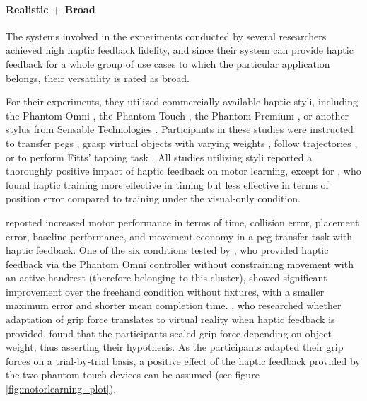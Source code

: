 \paragraph{Realistic + Broad} \label{sec:realisticbroad}
The systems involved in the experiments conducted by several researchers achieved high haptic feedback fidelity, and since their system can provide haptic feedback for a whole group of use cases to which the particular application belongs, their versatility is rated as broad.

For their experiments, they utilized commercially available haptic styli, including the Phantom Omni \cite{Brickler2019, Fehlberg2012}, the Phantom Touch \cite{Gunter2022}, the Phantom Premium \cite{Rodriguez2010, Wall2000}, or another stylus from Sensable Technologies \cite{Feygin2002HapticSkill}. Participants in these studies were instructed to transfer pegs \cite{Brickler2019}, grasp virtual objects with varying weights \cite{Gunter2022}, follow trajectories \cite{Fehlberg2012, Feygin2002HapticSkill, Rodriguez2010}, or to perform Fitts' tapping task \cite{Wall2000, Fitts1954TheMovement}. All studies utilizing styli reported a thoroughly positive impact of haptic feedback on motor learning, except for \cite{Feygin2002HapticSkill}, who found haptic training more effective in timing but less effective in terms of position error compared to training under the visual-only condition.

\cite{Brickler2019} reported increased motor performance in terms of time, collision error, placement error, baseline performance, and movement economy in a peg transfer task with haptic feedback. One of the six conditions tested by \cite{Fehlberg2012}, who provided haptic feedback via the Phantom Omni controller without constraining movement with an active handrest (therefore belonging to this cluster), showed significant improvement over the freehand condition without fixtures, with a smaller maximum error and shorter mean completion time. \cite{Gunter2022}, who researched whether adaptation of grip force translates to virtual reality when haptic feedback is provided, found that the participants scaled grip force depending on object weight, thus asserting their hypothesis. As the participants adapted their grip forces on a trial-by-trial basis, a positive effect of the haptic feedback provided by the two phantom touch devices can be assumed (see figure \ref{fig:motorlearning_plot}). 

